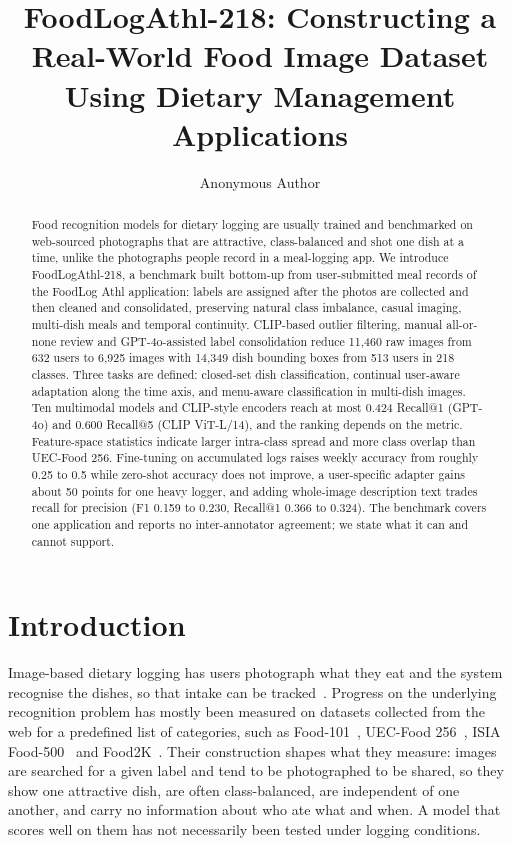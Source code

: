 \documentclass[sigconf, nonacm]{acmart}
\begin{document}
\title{FoodLogAthl-218: Constructing a Real-World Food Image Dataset\\ Using Dietary Management Applications}

\author{Anonymous Author}

\begin{abstract}
Food recognition models for dietary logging are usually trained and benchmarked on web-sourced photographs that are attractive, class-balanced and shot one dish at a time, unlike the photographs people record in a meal-logging app. We introduce FoodLogAthl-218, a benchmark built bottom-up from user-submitted meal records of the FoodLog Athl application: labels are assigned after the photos are collected and then cleaned and consolidated, preserving natural class imbalance, casual imaging, multi-dish meals and temporal continuity. CLIP-based outlier filtering, manual all-or-none review and GPT-4o-assisted label consolidation reduce 11,460 raw images from 632 users to 6,925 images with 14,349 dish bounding boxes from 513 users in 218 classes. Three tasks are defined: closed-set dish classification, continual user-aware adaptation along the time axis, and menu-aware classification in multi-dish images. Ten multimodal models and CLIP-style encoders reach at most 0.424 Recall@1 (GPT-4o) and 0.600 Recall@5 (CLIP ViT-L/14), and the ranking depends on the metric. Feature-space statistics indicate larger intra-class spread and more class overlap than UEC-Food 256. Fine-tuning on accumulated logs raises weekly accuracy from roughly 0.25 to 0.5 while zero-shot accuracy does not improve, a user-specific adapter gains about 50 points for one heavy logger, and adding whole-image description text trades recall for precision (F1 0.159 to 0.230, Recall@1 0.366 to 0.324). The benchmark covers one application and reports no inter-annotator agreement; we state what it can and cannot support.
\end{abstract}

\maketitle

\section{Introduction}
Image-based dietary logging has users photograph what they eat and the system recognise the dishes, so that intake can be tracked~\cite{aizawa2015foodlog,meyers2015im2calories,nakamoto2022foodlog}. Progress on the underlying recognition problem has mostly been measured on datasets collected from the web for a predefined list of categories, such as Food-101~\cite{bossard2014food}, UEC-Food 256~\cite{kawano2015automatic}, ISIA Food-500~\cite{min2020isia} and Food2K~\cite{min2023large}. Their construction shapes what they measure: images are searched for a given label and tend to be photographed to be shared, so they show one attractive dish, are often class-balanced, are independent of one another, and carry no information about who ate what and when. A model that scores well on them has not necessarily been tested under logging conditions.
\end{document}
